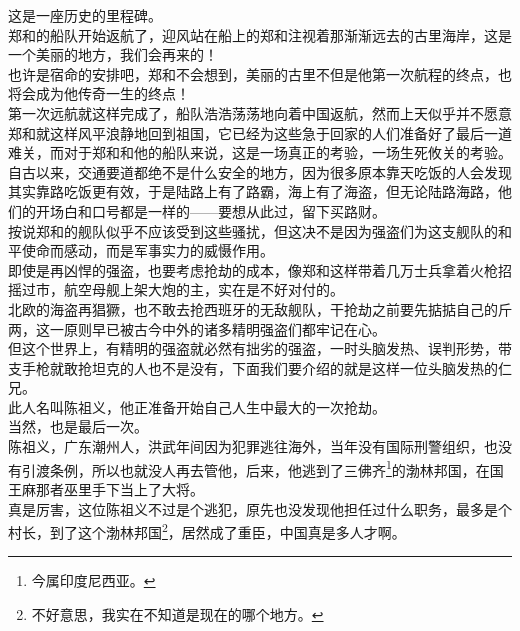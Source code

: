 \begin{multicols}{\theparacolNo}
这是一座历史的里程碑。\\

郑和的船队开始返航了，迎风站在船上的郑和注视着那渐渐远去的古里海岸，这是一个美丽的地方，我们会再来的！\\

也许是宿命的安排吧，郑和不会想到，美丽的古里不但是他第一次航程的终点，也将会成为他传奇一生的终点！\\

第一次远航就这样完成了，船队浩浩荡荡地向着中国返航，然而上天似乎并不愿意郑和就这样风平浪静地回到祖国，它已经为这些急于回家的人们准备好了最后一道难关，而对于郑和和他的船队来说，这是一场真正的考验，一场生死攸关的考验。\\

自古以来，交通要道都绝不是什么安全的地方，因为很多原本靠天吃饭的人会发现其实靠路吃饭更有效，于是陆路上有了路霸，海上有了海盗，但无论陆路海路，他们的开场白和口号都是一样的——要想从此过，留下买路财。\\

按说郑和的舰队似乎不应该受到这些骚扰，但这决不是因为强盗们为这支舰队的和平使命而感动，而是军事实力的威慑作用。\\

即使是再凶悍的强盗，也要考虑抢劫的成本，像郑和这样带着几万士兵拿着火枪招摇过市，航空母舰上架大炮的主，实在是不好对付的。\\

北欧的海盗再猖獗，也不敢去抢西班牙的无敌舰队，干抢劫之前要先掂掂自己的斤两，这一原则早已被古今中外的诸多精明强盗们都牢记在心。\\

但这个世界上，有精明的强盗就必然有拙劣的强盗，一时头脑发热、误判形势，带支手枪就敢抢坦克的人也不是没有，下面我们要介绍的就是这样一位头脑发热的仁兄。\\

此人名叫陈祖义，他正准备开始自己人生中最大的一次抢劫。\\

当然，也是最后一次。\\

陈祖义，广东潮州人，洪武年间因为犯罪逃往海外，当年没有国际刑警组织，也没有引渡条例，所以也就没人再去管他，后来，他逃到了三佛齐\footnote{今属印度尼西亚。}的渤林邦国，在国王麻那者巫里手下当上了大将。\\

真是厉害，这位陈祖义不过是个逃犯，原先也没发现他担任过什么职务，最多是个村长，到了这个渤林邦国\footnote{不好意思，我实在不知道是现在的哪个地方。}，居然成了重臣，中国真是多人才啊。\\


\end{multicols}
